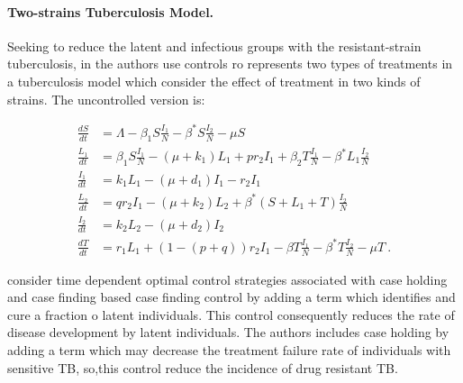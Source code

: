 \paragraph{Two-strains Tuberculosis Model.}
	Seeking to reduce the latent and infectious groups with the resistant-strain 
	tuberculosis, in \cite{Lenhart2002} the authors  use controls ro represents 
	two types of treatments in a tuberculosis model which consider the effect of 
	treatment in two kinds of strains. The uncontrolled version is:
	
	\begin{equation}\label{eqn:two_strain_TB}
	  \begin{aligned}
	    \frac{dS}{dt} &=
		    \Lambda - \beta_1 S \frac{I_1}{N} 
		    - \beta^{*} S \frac{I_2}{N}
		    - \mu S
		  \\
		  \frac{L_1}{dt} &=
			  \beta_1 S \frac{I_1}{N}
			  - (\mu + k_1) L_1
			  +  p r_2 I_1
				+ \beta_2 T \frac{I_1}{N}
				- \beta^{*} L_1 \frac{I_2}{N}
			\\
			\frac{I_1}{dt} &= 
				k_1 L_1
				- (\mu + d_1) I_1
				-r_2 I_1
			\\
			\frac{L_2}{dt} &=
				q r_2 I_1
				- (\mu + k_2) L_2
				+ \beta^{*} (S + L_1 + T) \frac{I_2}{N}
			\\
			\frac{I_2}{dt} &=
				k_2 L_2 - (\mu + d_2) I_2
			\\
			\frac{d T}{dt} &=
				r_1 L_1
				+ (1 - (p + q)) r_2 I_1
				- \beta T \frac{I_1}{N}
				- \beta^{*} T \frac{I_2}{N}
				-\mu T ~.
	  \end{aligned}
	\end{equation}

	\citeauthor*{Lenhart2002} consider time dependent 
optimal control strategies associated with case holding and case finding based 
case finding control by adding a term which identifies and cure a fraction o 
latent individuals. This control consequently reduces the rate of disease 
development by latent individuals. The authors includes case holding by adding a 
term which may decrease the treatment failure rate of individuals with sensitive 
TB, so,this control reduce the incidence of drug resistant TB. 

